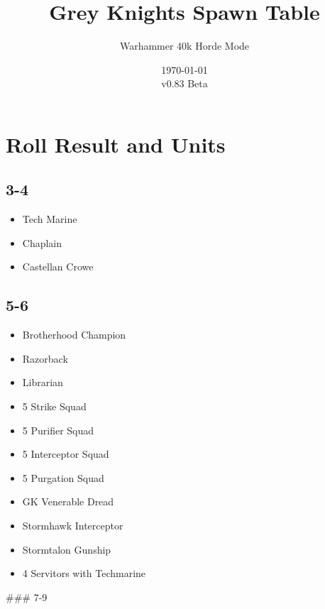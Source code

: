 \documentclass{HordeModeTarot}
\title{Grey Knights Spawn Table}
\author{Warhammer 40k Horde Mode}
\date{\today \\v0.83 Beta}
\begin{document}
\maketitle

\outputUsingSpawnTableBoilerplate
\section{Roll Result and Units}\hypertarget{roll-results}{}\label{roll-results}

\begin{multicols}{2}

\subsection*{3-4}

\begin{itemize}[leftmargin=*]
\item[] Tech Marine
\item[] Chaplain
\item[] Castellan Crowe
\end{itemize}

\subsection*{5-6}

\begin{itemize}[leftmargin=*]
\item[] Brotherhood Champion
\item[] Razorback
\item[] Librarian
\item[] 5 Strike Squad
\item[] 5 Purifier Squad
\item[] 5 Interceptor Squad
\item[] 5 Purgation Squad
\item[] GK Venerable Dread
\item[] Stormhawk Interceptor
\item[] Stormtalon Gunship
\item[] 4 Servitors with Techmarine
\end{itemize}

\#\#\# 7-9


\end{multicols}
\end{document}
